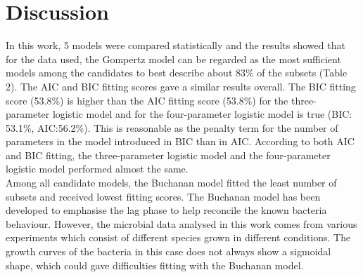 \documentclass[a4paper,11pt]{article}
\theoremstyle{definition}
\begin{document}
\section{Discussion}
In this work, 5 models were compared statistically and the results showed that for the data used, the Gompertz model can be regarded as the most sufficient models among the candidates to best describe about 83\% of the subsets (Table 2). The AIC and BIC fitting scores gave a similar results overall. The BIC fitting score (53.8\%) is higher than the AIC fitting score (53.8\%) for the three-parameter logistic model and for the four-parameter logistic model is true (BIC: 53.1\%, AIC:56.2\%). This is reasonable as the penalty term for the number of parameters in the model introduced in BIC than in AIC. According to both AIC and BIC fitting, the three-parameter logistic model and the four-parameter logistic model performed almost the same.\\
Among all candidate models, the Buchanan model fitted the least number of subsets and received lowest fitting scores. The Buchanan model has been developed to emphasise the lag phase to help reconcile the known bacteria behaviour. However, the microbial data analysed in this work comes from various experiments which consist of different species grown in different conditions. The growth curves of the bacteria in this case does not always show a sigmoidal shape, which could gave difficulties fitting with the Buchanan model.






  
\end{document}
